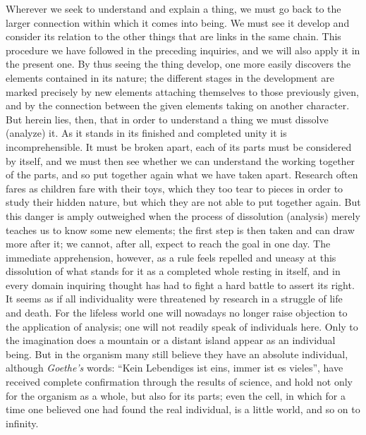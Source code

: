 \documentclass[12pt,a4paper,openany]{book}
\newcommand{\opage}[1]{\marginnote{\footnotesize\textit{[#1]}}}
\begin{document}
Wherever we seek to understand and explain a thing, we must go back to the
larger connection within which it comes into being. We must see it develop and
consider its relation to the other things that are links in the same chain.
This procedure we have followed in the preceding inquiries, and we will also
apply it in the present one. By thus seeing the thing develop, one more easily
discovers the elements contained in its nature; the different stages in the
development are marked precisely by new elements attaching themselves to those
previously given, and by the connection between the given elements taking on
another character. But herein lies, then, that in order to understand a thing
we must dissolve (analyze) it. As it stands in its finished and completed
unity it is incomprehensible. It must be broken apart, each of its parts must
be considered by itself, and we must then see whether we can understand the
working together of the parts, and so put together again what we have taken
apart. Research often fares as children fare with their toys, which they too
tear \opage{110}to pieces in order to study their hidden nature, but which
they are not able to put together again. But this danger is amply outweighed
when the process of dissolution (analysis) merely teaches us to know some new
elements; the first step is then taken and can draw more after it; we cannot,
after all, expect to reach the goal in one day. The immediate apprehension,
however, as a rule feels repelled and uneasy at this dissolution of what
stands for it as a completed whole resting in itself, and in every domain
inquiring thought has had to fight a hard battle to assert its right. It seems
as if all individuality were threatened by research in a struggle of life and
death. For the lifeless world one will nowadays no longer raise objection to
the application of analysis; one will not readily speak of individuals here.
Only to the imagination does a mountain or a distant island appear as an
individual being. But in the organism many still believe they have an absolute
individual, although \emph{Goethe's} words: ``Kein Lebendiges ist eins, immer
ist es vieles'', have received complete confirmation through the results of
science, and hold not only for the organism as a whole, but also for its
parts; even the cell, in which for a time one believed one had found the real
individual, is a little world, and so on to infinity.
\end{document}
